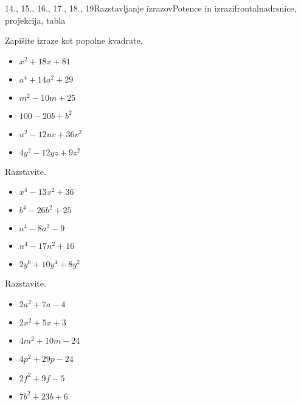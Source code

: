 \begin{priprava}{14., 15., 16., 17., 18., 19}{}{Razstavljanje izrazov}{Potence in izrazi}{frontalna}{drsnice, projekcija, tabla}
\begin{multicols}{2}
    
        
            \begin{naloga}
                Zapišite izraze kot popolne kvadrate.
                \begin{itemize}
                    \item $x^2+18x+81$ 
                    \item $a^4+14a^2+29$ 
                    \item $m^2-10m+25$ 
                    \item $100-20b+b^2$ 
                    \item $u^2-12uv+36v^2$ 
                    \item $4y^2-12yz+9z^2$ 
                \end{itemize}
            \end{naloga}
        
    
        
            \begin{naloga}
                Razstavite.
                \begin{itemize}
                    \item $x^4-13x^2+36$ 
                    \item $b^4-26b^2+25$ 
                    \item $a^4-8a^2-9$ 
                    \item $n^4-17n^2+16$ 
                    \item $2y^6+10y^4+8y^2$ 
                \end{itemize}
            \end{naloga}
    
    
        
            \begin{naloga}
                Razstavite.
                \begin{itemize}
                    \item $2a^2+7a-4$ 
                    \item $2x^2+5x+3$ 
                    \item $4m^2+10m-24$ 
                    \item $4p^2+29p-24$ 
                    \item $2f^2+9f-5$ 
                    \item $7b^2+23b+6$ 
                \end{itemize}
            \end{naloga}
        

\end{multicols}
\end{priprava}

